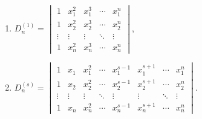 \begin{exercise}\label{chapter3:vandermonde-and-symmetric-polynomials}
    \begin{enumerate}[label = (\alph*)]
        \item $D^{(1)}_{n} = \begin{vmatrix}
                      1      & x_{1}^{2} & x_{1}^{3} & \cdots & x_{1}^{n} \\
                      1      & x_{2}^{2} & x_{2}^{3} & \cdots & x_{2}^{n} \\
                      \vdots & \vdots    & \vdots    & \ddots & \vdots    \\
                      1      & x_{n}^{2} & x_{n}^{3} & \cdots & x_{n}^{n}
                  \end{vmatrix}$,
        \item $D^{(s)}_{n} = \begin{vmatrix}
                      1      & x_{1}  & x_{1}^{2} & \cdots & x_{1}^{s-1} & x_{1}^{s+1} & \cdots & x_{1}^{n} \\
                      1      & x_{2}  & x_{2}^{2} & \cdots & x_{2}^{s-1} & x_{2}^{s+1} & \cdots & x_{2}^{n} \\
                      \vdots & \vdots & \vdots    & \ddots & \vdots      & \vdots      & \ddots & \vdots    \\
                      1      & x_{n}  & x_{n}^{2} & \cdots & x_{n}^{s-1} & x_{n}^{s+1} & \cdots & x_{n}^{n}
                  \end{vmatrix}$.
    \end{enumerate}
\end{exercise}

